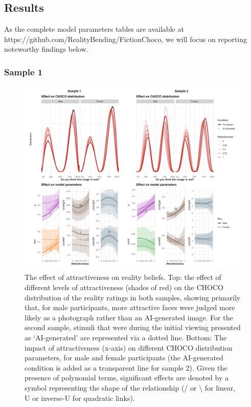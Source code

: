 \documentclass[
  jou,
  floatsintext,
  longtable,
  nolmodern,
  notxfonts,
  notimes,
  colorlinks=true,linkcolor=blue,citecolor=blue,urlcolor=blue]{apa7}
\begin{document}
\subsection{Results}\label{results-1}

As the complete model parameters tables are available at
https://github.com/RealityBending/FictionChoco, we will focus on
reporting noteworthy findings below.

\subsubsection{Sample 1}\label{sample-1}

\begin{figure}[!htbp]

{\caption{{The effect of attractiveness on reality beliefs. Top: the
effect of different levels of attractiveness (shades of red) on the
CHOCO distribution of the reality ratings in both samples, showing
primarily that, for male participants, more attractive faces were judged
more likely as a photograph rather than an AI-generated image. For the
second sample, stimuli that were during the initial viewing presented as
`AI-generated' are represented via a dotted line. Bottom: The impact of
attractiveness (x-axis) on different CHOCO distribution parameters, for
male and female participants (the AI-generated condition is added as a
transparent line for sample 2). Given the presence of polynomial terms,
significant effects are denoted by a symbol representing the shape of
the relationship (/ or \textbackslash{} for linear, U or inverse-U for
quadratic links).}{\label{fig-five}}}}

\begin{center}
\includegraphics[width=1\linewidth,height=\textheight,keepaspectratio]{./figures/fig5.png}
\end{center}

\end{figure}
\end{document}
